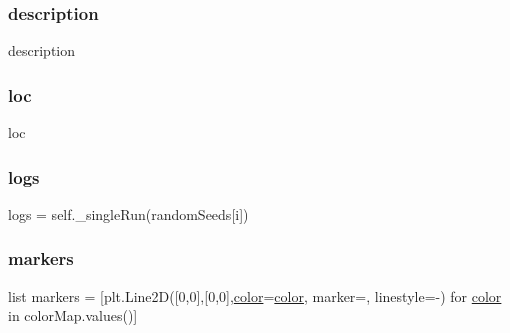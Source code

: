 \subsubsection{\texorpdfstring{description}{description}}
{\footnotesize\ttfamily description\hspace{0.3cm}{\ttfamily [static]}}

\mbox{\label{class_mu_mo_t_1_1_mu_mo_tview_aeee9f371db14fda0de35d16324a167df}} 
\subsubsection{\texorpdfstring{loc}{loc}}
{\footnotesize\ttfamily loc\hspace{0.3cm}{\ttfamily [static]}}

\mbox{\label{class_mu_mo_t_1_1_mu_mo_tview_a37d874d1d45bc2e5bfa013cddacb8e68}} 
\subsubsection{\texorpdfstring{logs}{logs}}
{\footnotesize\ttfamily logs = self.\+\_\+single\+Run(random\+Seeds\mbox{[}i\mbox{]})\hspace{0.3cm}{\ttfamily [static]}}

\mbox{\label{class_mu_mo_t_1_1_mu_mo_tview_a6a57a88c0fcb681f5721c6b1bce2dd96}} 
\subsubsection{\texorpdfstring{markers}{markers}}
{\footnotesize\ttfamily list markers = \mbox{[}plt.\+Line2D(\mbox{[}0,0\mbox{]},\mbox{[}0,0\mbox{]},\hyperlink{class_mu_mo_t_1_1_mu_mo_tview_a37dbdc30935031c05304482e1be89d8f}{color}=\hyperlink{class_mu_mo_t_1_1_mu_mo_tview_a37dbdc30935031c05304482e1be89d8f}{color}, marker=\textquotesingle{}\textquotesingle{}, linestyle=\textquotesingle{}-\/\textquotesingle{}) for \hyperlink{class_mu_mo_t_1_1_mu_mo_tview_a37dbdc30935031c05304482e1be89d8f}{color} in color\+Map.\+values()\mbox{]}\hspace{0.3cm}{\ttfamily [static]}}

